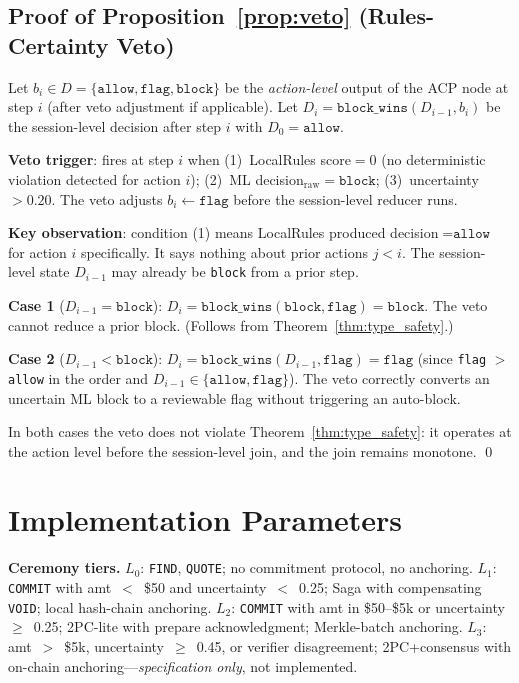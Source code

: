 \documentclass{article}
\begin{document}
\subsection{Proof of Proposition~\ref{prop:veto} (Rules-Certainty Veto)}

Let $b_i \in D = \{\texttt{allow}, \texttt{flag}, \texttt{block}\}$ be the \emph{action-level} output of the ACP node at step $i$ (after veto adjustment if applicable). Let $D_i = \texttt{block\_wins}(D_{i-1}, b_i)$ be the session-level decision after step $i$ with $D_0 = \texttt{allow}$.

\textbf{Veto trigger}: fires at step $i$ when (1)~LocalRules score$=0$ (no deterministic violation detected for action $i$); (2)~ML decision$_{\mathrm{raw}} = \texttt{block}$; (3)~uncertainty $> 0.20$. The veto adjusts $b_i \leftarrow \texttt{flag}$ before the session-level reducer runs.

\textbf{Key observation}: condition (1) means LocalRules produced decision$=\texttt{allow}$ for action $i$ specifically. It says nothing about prior actions $j < i$. The session-level state $D_{i-1}$ may already be \texttt{block} from a prior step.

\textbf{Case 1} ($D_{i-1} = \texttt{block}$): $D_i = \texttt{block\_wins}(\texttt{block}, \texttt{flag}) = \texttt{block}$. The veto cannot reduce a prior block. (Follows from Theorem~\ref{thm:type_safety}.)

\textbf{Case 2} ($D_{i-1} < \texttt{block}$): $D_i = \texttt{block\_wins}(D_{i-1}, \texttt{flag}) = \texttt{flag}$ (since \texttt{flag} $>$ \texttt{allow} in the order and $D_{i-1} \in \{\texttt{allow}, \texttt{flag}\}$). The veto correctly converts an uncertain ML block to a reviewable flag without triggering an auto-block.

In both cases the veto does not violate Theorem~\ref{thm:type_safety}: it operates at the action level before the session-level join, and the join remains monotone. \qed

\section{Implementation Parameters}
\label{app:impl}

\textbf{Ceremony tiers.} $L_0$: \texttt{FIND}, \texttt{QUOTE}; no commitment protocol, no
anchoring. $L_1$: \texttt{COMMIT} with amt~$<$~\$50 and uncertainty~$<$~0.25; Saga with
compensating \texttt{VOID}; local hash-chain anchoring. $L_2$: \texttt{COMMIT} with amt in
\$50--\$5k or uncertainty~$\ge$~0.25; 2PC-lite with prepare acknowledgment; Merkle-batch
anchoring. $L_3$: amt~$>$~\$5k, uncertainty~$\ge$~0.45, or verifier disagreement;
2PC+consensus with on-chain anchoring---\emph{specification only}, not implemented.
\end{document}
